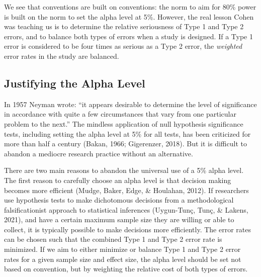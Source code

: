 \documentclass[
  english,
  ,jou, a4paper,floatsintext]{apa6}
\begin{document}
We see that conventions are built on conventions: the norm to aim for 80\% power is built on the norm to set the alpha level at 5\%. However, the real lesson Cohen was teaching us is to determine the relative seriousness of Type 1 and Type 2 errors, and to balance both types of errors when a study is designed. If a Type 1 error is considered to be four times as serious as a Type 2 error, the \emph{weighted} error rates in the study are balanced.

\hypertarget{justifying-the-alpha-level}{%
\subsection{Justifying the Alpha Level}\label{justifying-the-alpha-level}}

In 1957 Neyman wrote: ``it appears desirable to determine the level of significance in accordance with quite a few circumstances that vary from one particular problem to the next.'' The mindless application of null hypothesis significance tests, including setting the alpha level at 5\% for all tests, has been criticized for more than half a century (Bakan, 1966; Gigerenzer, 2018). But it is difficult to abandon a mediocre research practice without an alternative.

There are two main reasons to abandon the universal use of a 5\% alpha level. The first reason to carefully choose an alpha level is that decision making becomes more efficient (Mudge, Baker, Edge, \& Houlahan, 2012). If researchers use hypothesis tests to make dichotomous decisions from a methodological falsificationist approach to statistical inferences (Uygun-Tunç, Tunç, \& Lakens, 2021), and have a certain maximum sample size they are willing or able to collect, it is typically possible to make decisions more efficiently. The error rates can be chosen such that the combined Type 1 and Type 2 error rate is minimized. If we aim to either minimize or balance Type 1 and Type 2 error rates for a given sample size and effect size, the alpha level should be set not based on convention, but by weighting the relative cost of both types of errors.
\end{document}
